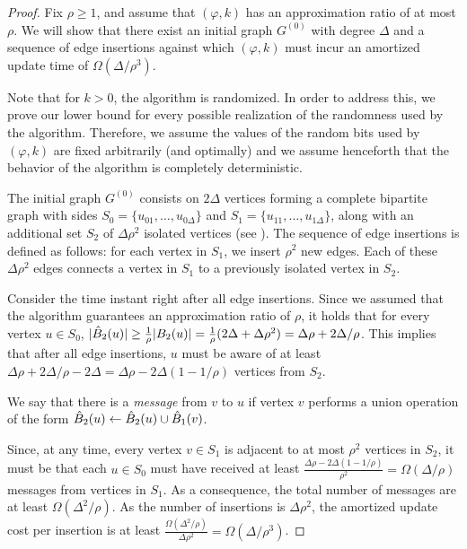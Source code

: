 \begin{proof}
Fix $\rho \ge 1$, and assume that \lazyscheme$(\varphi,k)$ has an approximation ratio of at most $\rho$. We will show that there exist an initial graph $G^{(0)}$ with degree $\Delta$ and a sequence of edge insertions against which \lazyscheme$(\varphi,k)$ must incur an amortized update time of $\Omega(\Delta/\rho^3)$.

Note that for $k>0$, the algorithm is randomized. In order to address this, we prove our lower bound for every possible realization of the randomness used by the algorithm. Therefore, we assume the values of the random bits used by \lazyscheme$(\varphi,k)$ are fixed arbitrarily (and optimally) and we assume henceforth that the behavior of the algorithm is completely deterministic. 

The initial graph $G^{(0)}$ consists on $2 \Delta$ vertices forming a complete bipartite graph with sides $S_0=\{u_{01},\dots,u_{0\Delta}\}$ and $S_1=\{u_{11},\dots,u_{1\Delta}\}$, along with an additional set $S_2$ of $\Delta \rho^2$ isolated vertices (see ).
The sequence of edge insertions is defined as follows: 
for each vertex in $S_1$, we insert $\rho^2$ new edges. Each of these $\Delta\rho^2$ edges connects a vertex in $S_1$ to a previously isolated vertex in $S_2$.



Consider the time instant right after all edge insertions. 
Since we assumed that the algorithm guarantees an approximation ratio of $\rho$, it holds that for every vertex $u \in S_0$, $|\hat{B}_2(u)| \ge \frac{1}{\rho} |B_2(u)|=\frac{1}{\rho} (2\Delta+\Delta \rho^2) = \Delta \rho + 2\Delta/\rho$. This implies that after all edge insertions, $u$ must be aware of at least $\Delta \rho + 2\Delta/\rho - 2\Delta=\Delta\rho -2 \Delta(1-1/\rho)$ vertices from $S_2$. 

We say that there is a \emph{message} from $v$ to $u$ if vertex $v$ performs a union operation of the form $\hat{B}_2(u) \gets \hat{B}_2(u) \cup \hat{B}_1(v)$.

Since, at any time, every vertex $v \in S_1$ is adjacent to at most $\rho^2$ vertices in $S_2$, it must be that each $u \in S_0$ must have received at least 
$\frac{\Delta\rho -2 \Delta(1-1/\rho)}{\rho^2}=\Omega(\Delta/\rho)$
messages from vertices in $S_1$. As a consequence, the total number of messages are at least $\Omega(\Delta^2/\rho)$. As the number of insertions is $\Delta \rho^2$, the amortized update cost per insertion is at least $\frac{\Omega(\Delta^2/\rho)}{\Delta \rho^2}=\Omega(\Delta/\rho^3)$.
\end{proof}

